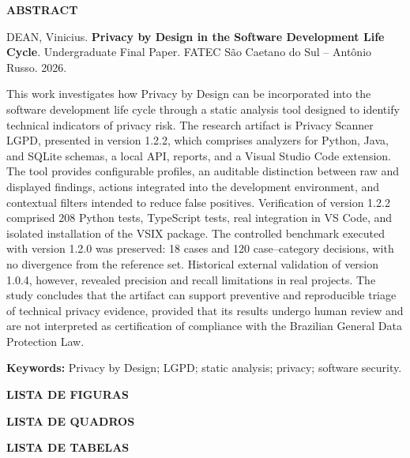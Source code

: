 \documentclass[12pt,a4paper,oneside]{report}
\makeatletter
\newcounter{quadro}
\newcommand{\listadefiguras}{%
  \clearpage
  \begin{center}\textbf{LISTA DE FIGURAS}\end{center}
  \thispagestyle{pretextual}
  {\renewcommand{\addvspace}[1]{}\@starttoc{lof}}
  \clearpage
}
\newcommand{\listadequadros}{%
  \clearpage
  \begin{center}\textbf{LISTA DE QUADROS}\end{center}
  \thispagestyle{pretextual}
  \@starttoc{loq}
  \clearpage
}
\newcommand{\listadetabelas}{%
  \clearpage
  \begin{center}\textbf{LISTA DE TABELAS}\end{center}
  \thispagestyle{pretextual}
  {\renewcommand{\addvspace}[1]{}\@starttoc{lot}}
  \clearpage
}
\newcommand{\tituloInglesTCC}{Privacy by Design in the Software Development Life Cycle}
\newenvironment{abstractmodelo}{%
\clearpage\thispagestyle{pretextual}\begin{center}\textbf{ABSTRACT}\end{center}\setstretch{1.5}
}{\clearpage}
\makeatother
\begin{document}
\begin{abstractmodelo}
DEAN, Vinicius. \textbf{\tituloInglesTCC}. Undergraduate Final Paper. FATEC São Caetano do Sul -- Antônio Russo. 2026.

This work investigates how Privacy by Design can be incorporated into the software development life cycle through a static analysis tool designed to identify technical indicators of privacy risk. The research artifact is Privacy Scanner LGPD, presented in version 1.2.2, which comprises analyzers for Python, Java, and SQLite schemas, a local API, reports, and a Visual Studio Code extension. The tool provides configurable profiles, an auditable distinction between raw and displayed findings, actions integrated into the development environment, and contextual filters intended to reduce false positives. Verification of version 1.2.2 comprised 208 Python tests, TypeScript tests, real integration in VS Code, and isolated installation of the VSIX package. The controlled benchmark executed with version 1.2.0 was preserved: 18 cases and 120 case--category decisions, with no divergence from the reference set. Historical external validation of version 1.0.4, however, revealed precision and recall limitations in real projects. The study concludes that the artifact can support preventive and reproducible triage of technical privacy evidence, provided that its results undergo human review and are not interpreted as certification of compliance with the Brazilian General Data Protection Law.

\noindent\textbf{Keywords:} Privacy by Design; LGPD; static analysis; privacy; software security.
\end{abstractmodelo}

\listadefiguras
\listadequadros
\listadetabelas
\end{document}
